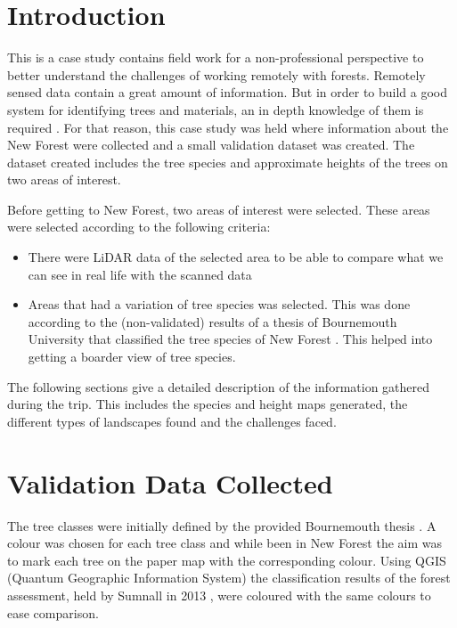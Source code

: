 \documentclass{subfiles}
\begin{document}
	\section{Introduction}
	\par This is a case study contains field work for a non-professional perspective to better understand the challenges of working remotely with forests. Remotely sensed data contain a great amount of information. But in order to build a good system for identifying trees and materials, an in depth knowledge of them is required \cite{Smith2012}. For that reason, this case study was held where information about the New Forest were collected and a small validation dataset was created. The dataset created includes the tree species and approximate heights of the trees on two areas of interest. 
	

	\par Before getting to New Forest, two areas of interest were selected. These areas were selected according to the following criteria:
	\begin{itemize}
		\item There were LiDAR data of the selected area to be able to compare what we can see in real life with the scanned data
		\item Areas that had a variation of tree species was selected. This was done according to the (non-validated) results of a thesis of Bournemouth University that classified the tree species of New Forest \cite{Sumnall2013}. This helped into getting a boarder view of tree species. 
	\end{itemize}
	
	\par The following sections give a detailed description of the information gathered during the trip. This includes the species and height maps generated, the different types of landscapes found and the challenges faced. 
		
	
	   \section{Validation Data Collected}
	   \par The tree classes were initially defined by the provided Bournemouth thesis \cite{Sumnall2013}. A colour was chosen for each tree class and while been in New Forest the aim was to mark each tree on the paper map with the corresponding colour. Using QGIS (Quantum Geographic Information System) the classification results of the forest assessment, held by Sumnall in 2013 \cite{Sumnall2013}, were coloured with the same colours to ease comparison.
	   
\end{document}
